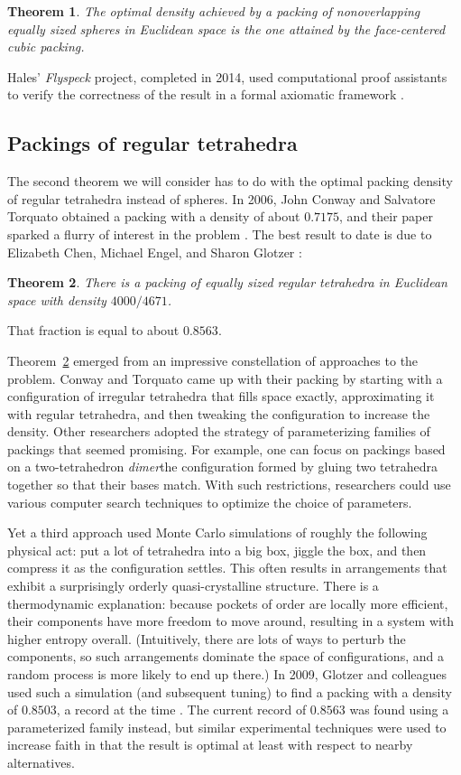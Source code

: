 \documentclass[12pt]{amsart}
\newtheorem{theorem}{Theorem}[section]
\theoremstyle{definition}
\theoremstyle{remark}
\numberwithin{equation}{section}
\begin{document}
\begin{theorem}
\label{theorem:hales}
The optimal density achieved by a packing of nonoverlapping equally sized spheres in Euclidean space is the one attained by the face-centered cubic packing.
\end{theorem}
\noindent Hales' \emph{Flyspeck} project, completed in 2014, used computational proof assistants to verify the correctness of the result in a formal axiomatic framework \cite{hales:et:al:17}.

\subsection{Packings of regular tetrahedra}

The second theorem we will consider has to do with the optimal packing density of regular tetrahedra instead of spheres. In 2006, John Conway and Salvatore Torquato obtained a packing with a density of about $0.7175$, and their paper sparked a flurry of interest in the problem \cite{conway:torquato:06}. The best result to date is due to Elizabeth Chen, Michael Engel, and Sharon Glotzer \cite{chen:engel:glotzer:10}:
\begin{theorem}
\label{theorem:tetrahedra}
There is a packing of equally sized regular tetrahedra in Euclidean space with density $4000/4671$.
\end{theorem}
\noindent That fraction is equal to about $0.8563$.

Theorem~\ref{theorem:tetrahedra} emerged from an impressive constellation of approaches to the problem. Conway and Torquato came up with their packing by starting with a configuration of irregular tetrahedra that fills space exactly, approximating it with regular tetrahedra, and then tweaking the configuration to increase the density. Other researchers adopted the strategy of parameterizing families of packings that seemed promising. For example, one can focus on packings based on a two-tetrahedron \emph{dimer}the configuration formed by gluing two tetrahedra together so that their bases match. With such restrictions, researchers could use various computer search techniques to optimize the choice of parameters.

Yet a third approach used Monte Carlo simulations of roughly the following physical act: put a lot of tetrahedra into a big box, jiggle the box, and then compress it as the configuration settles. This often results in arrangements that exhibit a surprisingly orderly quasi-crystalline structure. There is a thermodynamic explanation: because pockets of order are locally more efficient, their components have more freedom to move around, resulting in a system with higher entropy overall. (Intuitively, there are lots of ways to perturb the components, so such arrangements dominate the space of configurations, and a random process is more likely to end up there.) In 2009, Glotzer and colleagues used such a simulation (and subsequent tuning) to find a packing with a density of $0.8503$, a record at the time \cite{haji:akbari:et:al:09}. The current record of $0.8563$ was found using a parameterized family instead, but similar experimental techniques were used to increase faith in that the result is optimal at least with respect to nearby alternatives.
\end{document}
